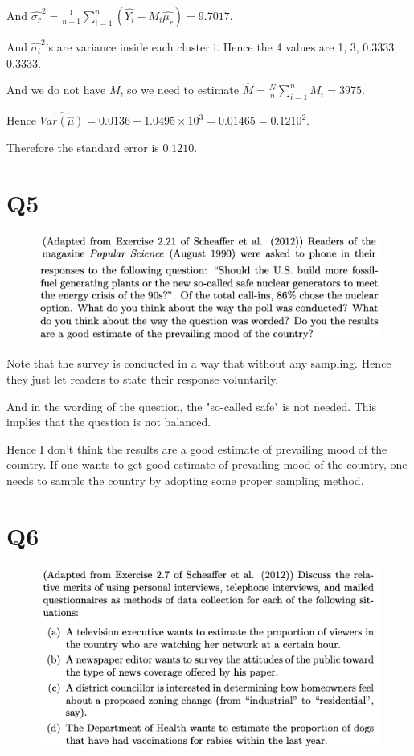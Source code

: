 \documentclass[12pt]{article}%
\begin{document}
And $\hat{\sigma_r}^2=\frac{1}{n-1}\sum_{i=1}^n(\hat{Y_i}-M_i \hat{\mu_r})=9.7017.$

And $\hat{\sigma_i}^2$'s are variance inside each cluster i. 
Hence the 4 values are 1, 3, 0.3333, 0.3333.

And we do not have $M$, so we need to estimate 
$\hat{M}=\frac{N}{n}\sum_{i=1}^n M_i=3975.$

Hence $\widehat{Var(\hat{\mu})}=0.0136+1.0495\times 10^3=0.01465=0.1210^2.$

Therefore the standard error is $0.1210.$

\newpage
\section{Q5}
\begin{figure}[htp]
    \includegraphics[width = 14cm]{img/Q5(1).png}
    \includegraphics[width = 14cm]{img/Q5(2).png}
\end{figure}

Note that the survey is conducted in a way that without any sampling. 
Hence they just let readers to state their response voluntarily. 

And in the wording of the question, the "so-called safe" is not needed. This implies that
the question is not balanced.

Hence I don't think the results are a good estimate of prevailing mood of the country. If
one wants to get good estimate of prevailing mood of the country, one needs to sample the 
country by adopting some proper sampling method.

\newpage
\section{Q6}
\begin{figure}[htp]
    \includegraphics[width = 14cm]{img/Q6.png}
\end{figure}
\end{document}
